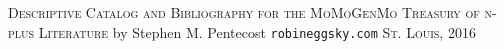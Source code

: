 \newpage
\begin{center}
\vspace*{5mm}
{\Huge
\textsc{Descriptive Catalog}
\linebreak
\linebreak
\textsc{and}
\linebreak
\linebreak
\textsc{Bibliography}
\linebreak
\linebreak
\textsc{for the}
\linebreak
\linebreak
\textsc{MoMoGenMo Treasury}
\linebreak
\linebreak
\textsc{of}
\linebreak
\linebreak
\textsc{n-plus Literature}
\linebreak
\linebreak
}
{\Large
\linebreak
\linebreak
\linebreak
\linebreak
by
\linebreak
\linebreak
\linebreak
}
{\huge
Stephen M. Pentecost
}
\linebreak
\linebreak
\linebreak
\linebreak
\linebreak
\linebreak
\linebreak
{\LARGE 
\texttt{robineggsky.com}
}
\linebreak
\linebreak
{\Large 
\textsc{St. Louis, 2016}
}
\end{center}
